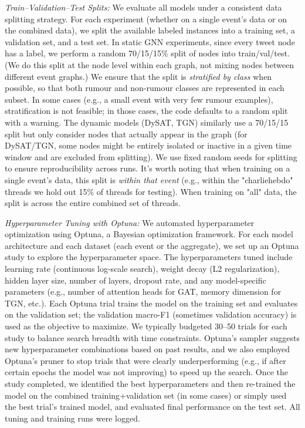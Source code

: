 \documentclass{cshonours}
\begin{document}
\emph{Train–Validation–Test Splits:} We evaluate all models under a consistent data splitting strategy. For each experiment (whether on a single event's data or on the combined data), we split the available labeled instances into a training set, a validation set, and a test set. In static GNN experiments, since every tweet node has a label, we perform a random 70/15/15\% split of nodes into train/val/test. (We do this split at the node level within each graph, not mixing nodes between different event graphs.) We ensure that the split is \emph{stratified by class} when possible, so that both rumour and non-rumour classes are represented in each subset. In some cases (e.g., a small event with very few rumour examples), stratification is not feasible; in those cases, the code defaults to a random split with a warning. The dynamic models (DySAT, TGN) similarly use a 70/15/15 split but only consider nodes that actually appear in the graph (for DySAT/TGN, some nodes might be entirely isolated or inactive in a given time window and are excluded from splitting). We use fixed random seeds for splitting to ensure reproducibility across runs. It's worth noting that when training on a single event's data, this split is \emph{within that event} (e.g., within the "charliehebdo" threads we hold out 15\% of threads for testing). When training on "all" data, the split is across the entire combined set of threads.

\emph{Hyperparameter Tuning with Optuna:} We automated hyperparameter optimization using Optuna, a Bayesian optimization framework. For each model architecture and each dataset (each event or the aggregate), we set up an Optuna study to explore the hyperparameter space. The hyperparameters tuned include learning rate (continuous log-scale search), weight decay (L2 regularization), hidden layer size, number of layers, dropout rate, and any model-specific parameters (e.g., number of attention heads for GAT, memory dimension for TGN, etc.). Each Optuna trial trains the model on the training set and evaluates on the validation set; the validation macro-F1 (sometimes validation accuracy) is used as the objective to maximize. We typically budgeted 30–50 trials for each study to balance search breadth with time constraints. Optuna's sampler suggests new hyperparameter combinations based on past results, and we also employed Optuna's pruner to stop trials that were clearly underperforming (e.g., if after certain epochs the model was not improving) to speed up the search. Once the study completed, we identified the best hyperparameters and then re-trained the model on the combined training+validation set (in some cases) or simply used the best trial's trained model, and evaluated final performance on the test set. All tuning and training runs were logged.
\end{document}
